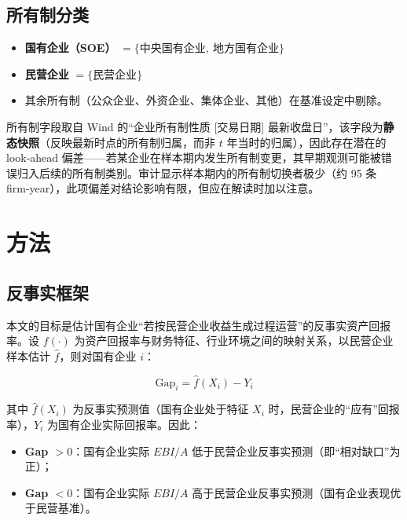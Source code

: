 \documentclass[11pt,a4paper]{ctexart}
\begin{document}
\subsection{所有制分类}

\begin{itemize}[leftmargin=2em,itemsep=0pt]
\item \textbf{国有企业（SOE）} $=\{\text{中央国有企业},\ \text{地方国有企业}\}$
\item \textbf{民营企业} $=\{\text{民营企业}\}$
\item 其余所有制（公众企业、外资企业、集体企业、其他）在基准设定中剔除。
\end{itemize}

所有制字段取自 Wind 的“企业所有制性质 [交易日期] 最新收盘日”，该字段为\textbf{静态快照}（反映最新时点的所有制归属，而非 $t$ 年当时的归属），因此存在潜在的 look-ahead 偏差——若某企业在样本期内发生所有制变更，其早期观测可能被错误归入后续的所有制类别。审计显示样本期内的所有制切换者极少（约 95 条 firm-year），此项偏差对结论影响有限，但应在解读时加以注意。

\section{方法}

\subsection{反事实框架}

本文的目标是估计国有企业“若按民营企业收益生成过程运营”的反事实资产回报率。设 $f(\cdot)$ 为资产回报率与财务特征、行业环境之间的映射关系，以民营企业样本估计 $\hat f$，则对国有企业 $i$：

\begin{equation}
\text{Gap}_i = \hat f(X_i) - Y_i
\end{equation}

其中 $\hat f(X_i)$ 为反事实预测值（国有企业处于特征 $X_i$ 时，民营企业的“应有”回报率），$Y_i$ 为国有企业实际回报率。因此：

\begin{itemize}[leftmargin=2em,itemsep=0pt]
\item \textbf{Gap $>0$}：国有企业实际 $EBI/A$ 低于民营企业反事实预测（即“相对缺口”为正）；
\item \textbf{Gap $<0$}：国有企业实际 $EBI/A$ 高于民营企业反事实预测（国有企业表现优于民营基准）。
\end{itemize}
\end{document}
